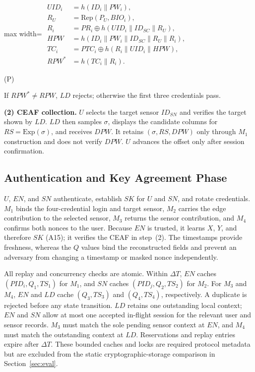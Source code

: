 \documentclass[cmc,article,submit,moreauthors,pdftex]{Definitions/tsp}
\renewcommand{\mathsf}[1]{\mathrm{#1}}
\newcommand{\cc}{\mathbin{\|}}
\newcommand{\Rep}{\mathrm{Rep}}
\newcounter{protoeq}
\newenvironment{ceq}{%
  \refstepcounter{protoeq}%
  \par\vspace{-3pt}\setlength{\topsep}{0pt}\setlength{\partopsep}{0pt}\begin{center}%
}{%
  \hspace{0.45em}\textup{(P\theprotoeq)}%
  \end{center}\vspace{-3pt}%
}
\begin{document}
\begin{ceq}
\begin{adjustbox}{max width=\columnwidth}
$\displaystyle\begin{aligned}
UID_i &= h(ID_i \cc PW_i),\\
R_U &= \Rep(P_U, BIO_i),\\
R_i &= PR_i \oplus h(UID_i \cc ID_{SC} \cc R_U),\\
HPW &= h(ID_i \cc PW_i \cc ID_{SC} \cc R_U \cc R_i),\\
TC_i &= PTC_i \oplus h(R_i \cc UID_i \cc HPW),\\
RPW^{*} &= h(TC_i \cc R_i).
\end{aligned}$
\end{adjustbox}
\end{ceq}

If $RPW^{*}\neq RPW$, $LD$ rejects; otherwise the first three credentials pass.

\textbf{(2) CEAF collection.} $U$ selects the target sensor $ID_{SN}$ and verifies the target shown by $LD$. $LD$ then samples $\sigma$, displays the candidate columns for $RS=\mathsf{Exp}(\sigma)$, and receives $DPW$. It retains $(\sigma,RS,DPW)$ only through $M_1$ construction and does not verify $DPW$. $U$ advances the offset only after session confirmation.

\subsection{Authentication and Key Agreement Phase}\label{sec:aka}

$U$, $EN$, and $SN$ authenticate, establish $SK$ for $U$ and $SN$, and rotate credentials. $M_1$ binds the four-credential login and target sensor, $M_2$ carries the edge contribution to the selected sensor, $M_3$ returns the sensor contribution, and $M_4$ confirms both nonces to the user. Because $EN$ is trusted, it learns $X$, $Y$, and therefore $SK$ (A15); it verifies the CEAF in step~(2). The timestamps provide freshness, whereas the $Q$ values bind the reconstructed fields and prevent an adversary from changing a timestamp or masked nonce independently.

All replay and concurrency checks are atomic. Within $\Delta T$, $EN$ caches $(PID_i,Q_1,TS_1)$ for $M_1$, and $SN$ caches $(PID_j,Q_2,TS_2)$ for $M_2$. For $M_3$ and $M_4$, $EN$ and $LD$ cache $(Q_3,TS_3)$ and $(Q_4,TS_4)$, respectively. A duplicate is rejected before any state transition. $LD$ retains one outstanding local context; $EN$ and $SN$ allow at most one accepted in-flight session for the relevant user and sensor records. $M_3$ must match the sole pending sensor context at $EN$, and $M_4$ must match the outstanding context at $LD$. Reservations and replay entries expire after $\Delta T$. These bounded caches and locks are required protocol metadata but are excluded from the static cryptographic-storage comparison in Section~\ref{sec:eval}.
\end{document}

